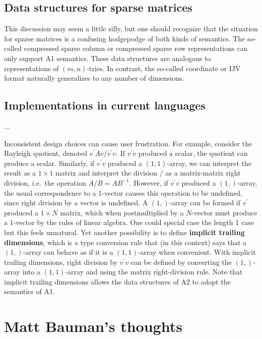 \subsection{Data structures for sparse matrices}

This discussion may seem a little silly, but one should recognize
that the situation for sparse matrices is a confusing hodgepodge of
both kinds of semantics. The so-called compressed sparse column or
compressed sparse row representations can only support A1 semantics.
These data structures are analogous to representations of $\left(m,n\right)$-tries.
In contrast, the so-called coordinate or IJV format naturally generalizes
to any number of dimensions.

\subsection{Implementations in current languages}


...

Inconsistent design choices can cause user frustration. For example,
consider the Rayleigh quotient, denoted $v^{\prime}Av/v^{\prime}v$.
If $v^{\prime}v$ produced a scalar, the quotient can produce a scalar.
Similarly, if $v^{\prime}v$ produced a $\left(1,1\right)$-array,
we can interpret the result as a $1\times1$ matrix and interpret
the division $/$ as a matrix-matrix right division, i.e.\ the operation
$A/B=AB^{-1}$. However, if $v^{\prime}v$ produced a $\left(1,\right)$-array,
the usual correspondence to a 1-vector causes this operation to be
undefined, since right division by a vector is undefined. A $(1,)$-array
can be formed if $v^{\prime}$ produced a $1\times N$ matrix, which
when postmultiplied by a $N$-vector must produce a $1$-vector by
the rules of linear algebra. One could special case the length 1 case
but this feels unnatural. Yet another possibility is to define \textbf{implicit
trailing dimensions}, which is a type conversion rule that (in this
context) says that a $(1,)$-array can behave as if it is a $(1,1)$-array
when convenient. With implicit trailing dimensions, right division
by $v^{\prime}v$ can be defined by converting the $(1,)$-array into
a $(1,1)$-array and using the matrix right-division rule. Note that
implicit trailing dimensions allows the data structures of A2 to adopt
the semantics of A1.


\section{Matt Bauman's thoughts}

